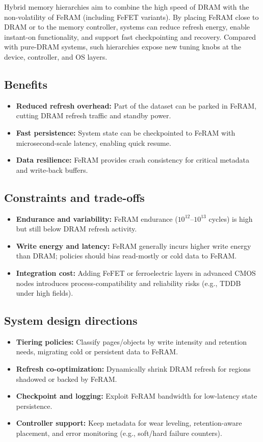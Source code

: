 Hybrid memory hierarchies aim to combine the high speed of DRAM with the non-volatility of FeRAM (including FeFET variants). By placing FeRAM close to DRAM or to the memory controller, systems can reduce refresh energy, enable instant-on functionality, and support fast checkpointing and recovery. Compared with pure-DRAM systems, such hierarchies expose new tuning knobs at the device, controller, and OS layers.

\subsection*{Benefits}
\begin{itemize}
  \item \textbf{Reduced refresh overhead:} Part of the dataset can be parked in FeRAM, cutting DRAM refresh traffic and standby power.
  \item \textbf{Fast persistence:} System state can be checkpointed to FeRAM with microsecond-scale latency, enabling quick resume.
  \item \textbf{Data resilience:} FeRAM provides crash consistency for critical metadata and write-back buffers.
\end{itemize}

\subsection*{Constraints and trade-offs}
\begin{itemize}
  \item \textbf{Endurance and variability:} FeRAM endurance ($10^{12}$--$10^{13}$ cycles) is high but still below DRAM refresh activity.
  \item \textbf{Write energy and latency:} FeRAM generally incurs higher write energy than DRAM; policies should bias read-mostly or cold data to FeRAM.
  \item \textbf{Integration cost:} Adding FeFET or ferroelectric layers in advanced CMOS nodes introduces process-compatibility and reliability risks (e.g., TDDB under high fields).
\end{itemize}

\subsection*{System design directions}
\begin{itemize}
  \item \textbf{Tiering policies:} Classify pages/objects by write intensity and retention needs, migrating cold or persistent data to FeRAM.
  \item \textbf{Refresh co-optimization:} Dynamically shrink DRAM refresh for regions shadowed or backed by FeRAM.
  \item \textbf{Checkpoint and logging:} Exploit FeRAM bandwidth for low-latency state persistence.
  \item \textbf{Controller support:} Keep metadata for wear leveling, retention-aware placement, and error monitoring (e.g., soft/hard failure counters).
\end{itemize}

